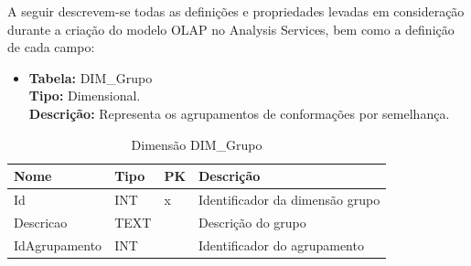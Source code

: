 A seguir descrevem-se todas as definições e propriedades levadas em consideração durante a criação do modelo OLAP no Analysis Services, bem como a definição de cada campo:
	
\begin{itemize}
	\item
		\textbf{Tabela:} DIM\_Grupo \\
		\textbf{Tipo:} Dimensional. \\
		\textbf{Descrição:} Representa os agrupamentos de conformações por semelhança.
\end{itemize}
\begin{table}[h]
	\caption{Dimensão DIM\_Grupo}
	\centering
	\begin{tabular}{@{}llll@{}}
	\toprule
	\textbf{Nome} & \textbf{Tipo} & \textbf{PK} & \textbf{Descrição}           		\\ \midrule
	Id            & INT           & x           & Identificador da dimensão grupo   \\
	Descricao     & TEXT       &             & Descrição do grupo           		\\
	IdAgrupamento & INT           &             & Identificador do agrupamento 		\\ \bottomrule
	\end{tabular}
\end{table}


\newpage

